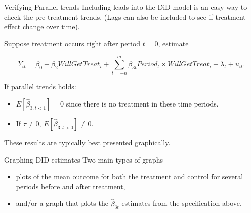 \documentclass[
  ignorenonframetext,
]{beamer}
\begin{document}
\begin{frame}{Verifying Parallel trends}
\protect\hypertarget{verifying-parallel-trends-1}{}
Including leads into the DiD model is an easy way to check the
pre-treatment trends. (Lags can also be included to see if treatment
effect change over time).

Suppose treatment occurs right after period \(t=0\), estimate

\[
Y_{it}=\beta_0+\beta_2WillGetTreat_i+\sum_{t=-n}^m\beta_{3t}Period_t \times WillGetTreat_i+\lambda_t+u_{it}.
\]

If parallel trends holds:

\begin{itemize}
\item
  \(E[\hat{\beta}_{3,t<1}]=0\) since there is no treatment in these time
  periods.
\item
  If \(\tau\neq0\), \(E[\hat{\beta}_{3,t>0}]\neq0\).
\end{itemize}

These results are typically best presented graphically.
\end{frame}

\begin{frame}{Graphing DID estimates}
\protect\hypertarget{graphing-did-estimates}{}
Two main types of graphs

\begin{itemize}
\item
  plots of the mean outcome for both the treatment and control for
  several periods before and after treatment,
\item
  and/or a graph that plots the \(\hat{\beta}_{3t}\) estimates from the
  specification above.
\end{itemize}
\end{frame}
\end{document}
